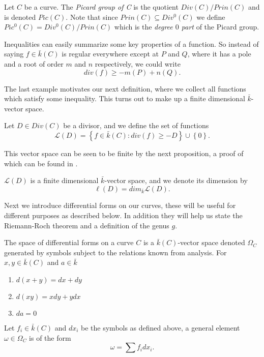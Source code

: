 \begin{mydef}
 Let $C$ be a curve. The \emph{Picard group of C} is the quotient $Div(C)/Prin(C)$ and is denoted $Pic(C)$.
Note that since $Prin(C) \subseteq Div^0(C)$ we define $Pic^0(C) = Div^0(C)/Prin(C)$ which is the
\emph{degree $0$ part} of the Picard group.
\end{mydef}


\begin{ex}
 Inequalities can easily summarize some key properties of a function. So instead of
saying $f \in \bar{k}(C)$ is regular everywhere except at $P$ and $Q$, where it has a
pole and a root of order $m$ and $n$ respectively, we could write
$$ div(f) \geq -m(P)+n(Q).$$
\end{ex}



The last example motivates our next definition, where we collect all functions
which satisfy some inequality. This turns out to make up a finite dimensional
$\bar{k}$-vector space.

\begin{mydef}
 Let $D \in Div(C)$ be a divisor, and we define the set of functions
$$ \mathscr{L}(D) = \left\{ f\in \bar{k}(C) : div(f) \geq -D \right\} \cup \left\{ 0\right\}. $$
\end{mydef}

This vector space can be seen to be finite by the next proposition, a proof of
which can be found in \cite{Fulton}.

\begin{prop}
 $\mathscr{L}(D)$ is a finite dimensional $\bar{k}$-vector space, and we denote
its dimension by
$$ \ell(D) = dim_{\bar{k}} \mathscr{L}(D). $$
\end{prop}

Next we introduce differential forms on our curves, these will be useful for different purposes
as described below. In addition they will help us state the Riemann-Roch theorem and a definition
of the genus $g$.

\begin{mydef}
 The space of differential forms on a curve $C$ is a $\bar{k}(C)$-vector space denoted $\Omega_C$
generated by symbols subject to the relations known from analysis. 
For $x, y \in \bar{k}(C)$ and $a \in \bar{k}$
\begin{enumerate}
  \item $d(x+y) = dx + dy$
  \item $d(xy) = xdy + ydx$
  \item $da = 0$
\end{enumerate}
Let $f_i \in \bar{k}(C)$ and $dx_i$ be the symbols as defined above, a general
element $\omega \in \Omega_C$ is of the form
$$ \omega = \sum f_i dx_i.$$
\end{mydef}


